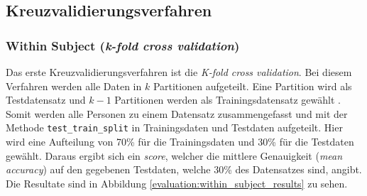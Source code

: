 \subsection{Kreuzvalidierungsverfahren}
\subsubsection{Within Subject (\textit{k-fold cross validation})}
Das erste Kreuzvalidierungsverfahren ist die \textit{K-fold cross validation}.
Bei diesem Verfahren werden alle Daten in $k$ Partitionen aufgeteilt.
Eine Partition wird als Testdatensatz und $k-1$ Partitionen werden als Trainingsdatensatz gewählt \cite{neumannMaschineLearningKIT2020}.
Somit werden alle Personen zu einem Datensatz zusammengefasst und mit der Methode \texttt{test\_train\_split} in Trainingsdaten und Testdaten aufgeteilt.
Hier wird eine Aufteilung von 70\% für die Trainingsdaten und 30\% für die Testdaten gewählt. 
Daraus ergibt sich ein \textit{score}, welcher die mittlere Genauigkeit (\textit{mean accuracy}) auf den gegebenen Testdaten, welche 30\% des Datensatzes sind, angibt.
Die Resultate sind in Abbildung \ref{evaluation:within_subject_results} zu sehen.


